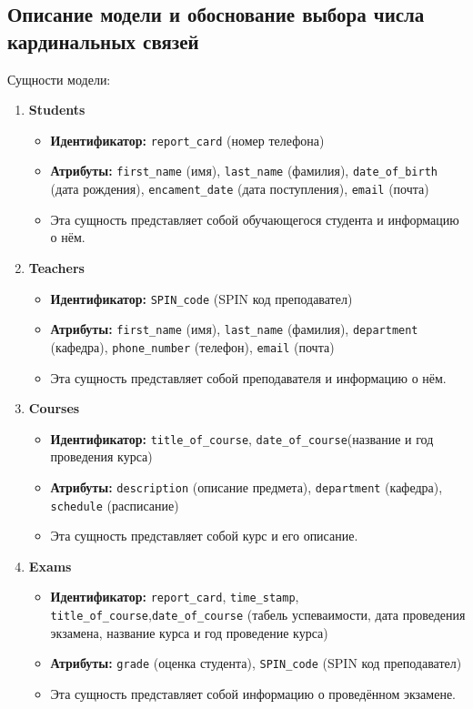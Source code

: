 \documentclass[a4paper, 14pt]{extarticle}
\begin{document}
\subsection{Описание модели и обоснование выбора числа кардинальных связей}\label{Sect::task}
Сущности модели:
\begin{enumerate}
    \item \textbf{Students}
        \begin{itemize}
            \item \textbf{Идентификатор:} \texttt{report\_сard} (номер телефона)
            \item \textbf{Атрибуты:} \texttt{first\_name} (имя), \texttt{last\_name} (фамилия), \texttt{date\_of\_birth} (дата рождения), \texttt{encament\_date} (дата поступления), \texttt{email} (почта)
            \item Эта сущность представляет собой обучающегося студента и информацию о нём.
        \end{itemize}
    
    \item \textbf{Teachers}
        \begin{itemize}
            \item \textbf{Идентификатор:} \texttt{SPIN\_code} (SPIN код преподавател)
            \item \textbf{Атрибуты:} \texttt{first\_name} (имя), \texttt{last\_name} (фамилия), \texttt{department} (кафедра), \texttt{phone\_number} (телефон), \texttt{email} (почта)
            \item Эта сущность представляет собой преподавателя и информацию о нём.
        \end{itemize}

    \item \textbf{Courses}
        \begin{itemize}
            \item \textbf{Идентификатор:} \texttt{title\_of\_course}, \texttt{date\_of\_course}(название и год проведения курса)
            \item \textbf{Атрибуты:} \texttt{description} (описание предмета), \texttt{department} (кафедра), \texttt{schedule} (расписание)
            \item Эта сущность представляет собой курс и его описание.
        \end{itemize}

    \item \textbf{Exams}
        \begin{itemize}
            \item \textbf{Идентификатор:} \texttt{report\_card}, \texttt{time\_stamp}, \texttt{title\_of\_course},\texttt{date\_of\_course} (табель успеваимости, дата проведения экзамена, название курса и год проведение курса)
            \item \textbf{Атрибуты:} \texttt{grade} (оценка студента), \texttt{SPIN\_code} (SPIN код преподавател)
            \item Эта сущность представляет собой информацию о проведённом экзамене.
        \end{itemize}
\end{enumerate}
\end{document}
